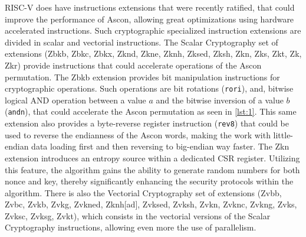 \documentclass[11pt,twoside]{article}
\begin{document}
RISC-V does have instructions extensions that were recently ratified, that could improve the performance of Ascon, allowing great optimizations using hardware accelerated instructions. Such cryptographic specialized instruction extensions are divided in scalar \cite{riscvCryptoVol1} and vectorial \cite{riscvCryptoVol2} instructions. The Scalar Cryptography set of extensions (\textsf{Zbkb}, \textsf{Zbkc}, \textsf{Zbkx}, \textsf{Zknd}, \textsf{Zkne}, \textsf{Zknh}, \textsf{Zksed}, \textsf{Zksh}, \textsf{Zkn}, \textsf{Zks}, \textsf{Zkt}, \textsf{Zk}, \textsf{Zkr}) provide instructions that could accelerate operations of the Ascon permutation. The \textsf{Zbkb} extension provides bit manipulation instructions for cryptographic operations. Such operations are bit rotations (\texttt{rori}), and, bitwise logical AND operation between a value $a$ and the bitwise inversion of a value $b$ (\texttt{andn}), that could accelerate the Ascon permutation as seen in \cref{lst:1}. This same extension also provides a byte-reverse register instruction (\texttt{rev8}) that could be used to reverse the endianness of the Ascon words, making the work with little-endian data loading first and then reversing to big-endian way faster. The \textsf{Zkn} extension introduces an entropy source within a dedicated CSR register. Utilizing this feature, the algorithm gains the ability to generate random numbers for both nonce and key, thereby significantly enhancing the security protocols within the algorithm. There is also the Vectorial Cryptography set of extensions (\textsf{Zvbb}, \textsf{Zvbc}, \textsf{Zvkb}, \textsf{Zvkg}, \textsf{Zvkned}, \textsf{Zknh[ad]}, \textsf{Zvksed}, \textsf{Zvksh}, \textsf{Zvkn}, \textsf{Zvknc}, \textsf{Zvkng}, \textsf{Zvks}, \textsf{Zvksc}, \textsf{Zvksg}, \textsf{Zvkt}), which consists in the vectorial versions of the Scalar Cryptography instructions, allowing even more the use of parallelism.

\printbibliography
\end{document}
